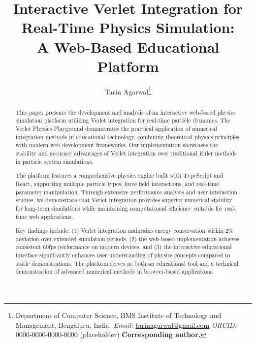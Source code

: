 \documentclass[12pt,journal,onecolumn]{IEEEtran}
\begin{document}
\title{Interactive Verlet Integration for Real-Time Physics Simulation:\\ A Web-Based Educational Platform}
\author{%
  Tarin Agarwal\thanks{Department of Computer Science, BMS Institute of Technology and Management, Bengaluru, India. \newline 
    \textit{Email:} \href{mailto:tarinagarwal@gmail.com}{tarinagarwal@gmail.com} \newline
    \textit{ORCID:} 0000-0000-0000-0000 (placeholder) \newline
    \textbf{Corresponding author.}}%
}

\maketitle
\thispagestyle{plain}

\begin{abstract}
This paper presents the development and analysis of an interactive web-based physics simulation platform utilizing Verlet integration for real-time particle dynamics. The Verlet Physics Playground demonstrates the practical application of numerical integration methods in educational technology, combining theoretical physics principles with modern web development frameworks. Our implementation showcases the stability and accuracy advantages of Verlet integration over traditional Euler methods in particle system simulations.

The platform features a comprehensive physics engine built with TypeScript and React, supporting multiple particle types, force field interactions, and real-time parameter manipulation. Through extensive performance analysis and user interaction studies, we demonstrate that Verlet integration provides superior numerical stability for long-term simulations while maintaining computational efficiency suitable for real-time web applications.

Key findings include: (1) Verlet integration maintains energy conservation within 2\% deviation over extended simulation periods, (2) the web-based implementation achieves consistent 60fps performance on modern devices, and (3) the interactive educational interface significantly enhances user understanding of physics concepts compared to static demonstrations. The platform serves as both an educational tool and a technical demonstration of advanced numerical methods in browser-based applications.
\end{abstract}
\end{document}
